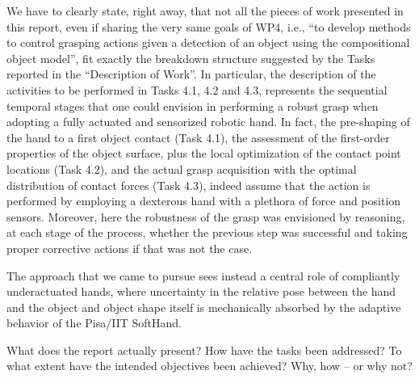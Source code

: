 \documentclass[a4paper,11pt,pdf]{pacmanreport}
\begin{document}
We have to clearly state, right away, that not all the pieces of work presented in this report, even if sharing the very same goals of WP4, i.e., ``to develop methods to control grasping actions given a detection of an object using the compositional object model'', fit exactly the breakdown structure suggested by the Tasks reported in the ``Description of Work''. In particular, the description of the activities to be performed in Tasks 4.1, 4.2 and 4.3, represents the sequential temporal stages that one could envision in performing a robust grasp when adopting a fully actuated and sensorized robotic hand. In fact, the pre-shaping of the hand to a first object contact (Task 4.1), the assessment of the first-order properties of the object surface, plus the local optimization of the contact point locations (Task 4.2), and the actual grasp acquisition with the optimal distribution of contact forces (Task 4.3), indeed assume that the action is performed by employing a dexterous hand with a plethora of force and position sensors. Moreover, here the robustness of the grasp was envisioned by reasoning, at each stage of the process, whether the previous step was successful and taking proper corrective actions if that was not the case.

The approach that we came to pursue sees instead a central role of compliantly underactuated hands, where uncertainty in the relative pose between the hand and the object and object shape itself is mechanically absorbed by the adaptive behavior of the Pisa/IIT SoftHand.

What does the report actually present? How have the tasks been addressed? To what extent have the intended objectives been achieved? Why, how -- or why not?




\end{document}
